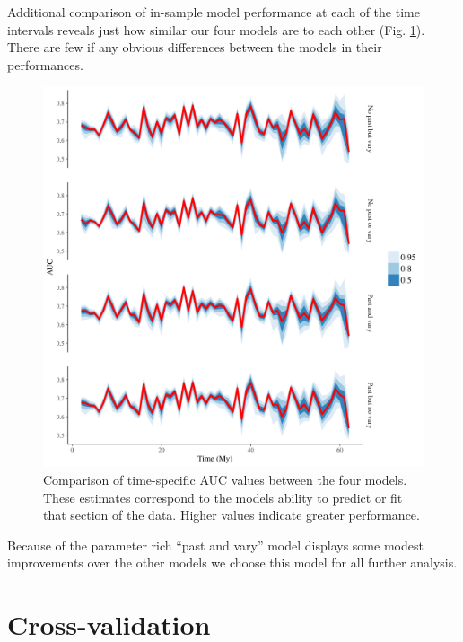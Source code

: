 \documentclass[12pt,letterpaper]{article}
\begin{document}
Additional comparison of in-sample model performance at each of the time intervals reveals just how similar our four models are to each other (Fig. \ref{fig:roc_ts}). There are few if any obvious differences between the models in their performances.
\begin{figure}[ht]
  \centering
  \includegraphics[width=\textwidth,height=0.5\textheight,keepaspectratio=true]{figure/roc_ts}
  \caption{Comparison of time-specific AUC values between the four models. These estimates correspond to the models ability to predict or fit that section of the data. Higher values indicate greater performance.}
  \label{fig:roc_ts}
\end{figure}

Because of the parameter rich ``past and vary'' model displays some modest improvements over the other models we choose this model for all further analysis.

\section{Cross-validation}
\end{document}

